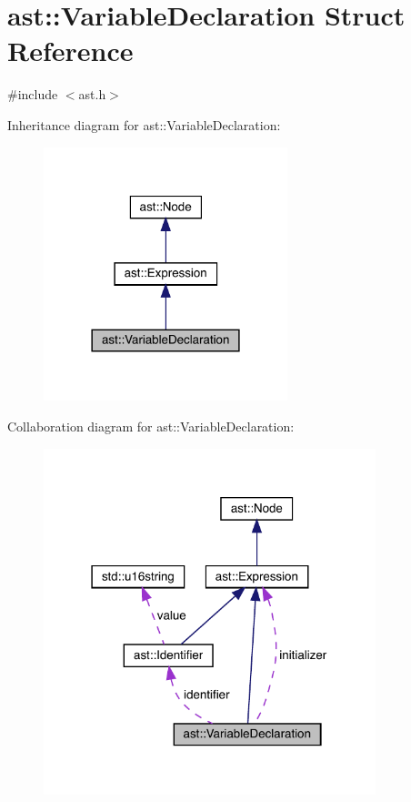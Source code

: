 \hypertarget{structast_1_1_variable_declaration}{}\section{ast\+:\+:Variable\+Declaration Struct Reference}
\label{structast_1_1_variable_declaration}


{\ttfamily \#include $<$ast.\+h$>$}



Inheritance diagram for ast\+:\+:Variable\+Declaration\+:
\nopagebreak
\begin{figure}[H]
\begin{center}
\leavevmode
\includegraphics[width=201pt]{structast_1_1_variable_declaration__inherit__graph}
\end{center}
\end{figure}


Collaboration diagram for ast\+:\+:Variable\+Declaration\+:
\nopagebreak
\begin{figure}[H]
\begin{center}
\leavevmode
\includegraphics[width=274pt]{structast_1_1_variable_declaration__coll__graph}
\end{center}
\end{figure}
